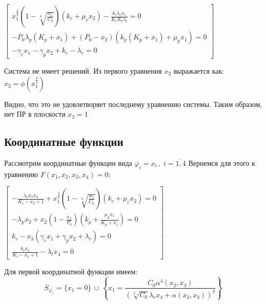 \documentclass[11pt]{article}
\begin{document}
    
    $\displaystyle \left[\begin{matrix}x_{1}^{\frac{3}{4}} \left(1 - \sqrt[4]{\frac{x_{1}}{C_{0}}}\right) \left(k_{c} + \mu_{c} x_{2}\right) - \frac{k_{t} \lambda_{c} x_{1}}{K_{c} K_{t} \lambda_{t}} = 0\\- P_{0} \lambda_{p} \left(K_{p} + x_{1}\right) + \left(P_{0} - x_{2}\right) \left(k_{p} \left(K_{p} + x_{1}\right) + \mu_{p} x_{1}\right) = 0\\- \gamma_{c} x_{1} - \gamma_{p} x_{2} + k_{r} - \lambda_{r} = 0\end{matrix}\right]$

    
    Система не имеет решений. Из первого уравнения $x_2$ выражается как:  $x_2 = \phi(x_1^{\frac{3}{4}})$

    
    Видно, что это не удовлетворяет последнему уравнению системы. Таким образом, нет ПР в плоскости $x_3 = 1$

    
    \hypertarget{ux43aux43eux43eux440ux434ux438ux43dux430ux442ux43dux44bux435-ux444ux443ux43dux43aux446ux438ux438}{%
\subsection{Координатные
функции}\label{ux43aux43eux43eux440ux434ux438ux43dux430ux442ux43dux44bux435-ux444ux443ux43dux43aux446ux438ux438}}

    Рассмотрим координатные функции вида
\(\varphi_i = x_i\,,\; i = \overline{1,4}\) Вернемся для этого к
уравнению \(F(x_1,x_2,x_3,x_4) = 0:\)

    $\displaystyle \left[\begin{matrix}- \frac{\lambda_{c} x_{1} x_{4}}{K_{c} - x_{3} + 1} + x_{1}^{\frac{3}{4}} \left(1 - \sqrt[4]{\frac{x_{1}}{C_{0}}}\right) \left(k_{c} + \mu_{c} x_{2}\right) = 0\\- \lambda_{p} x_{2} + x_{2} \left(1 - \frac{x_{2}}{P_{0}}\right) \left(k_{p} + \frac{\mu_{p} x_{1}}{K_{p} + x_{1}}\right) = 0\\k_{r} - x_{3} \left(\gamma_{c} x_{1} + \gamma_{p} x_{2} + \lambda_{r}\right) = 0\\\frac{k_{t} x_{3}}{K_{t} - x_{3} + 1} - \lambda_{t} x_{4} = 0\end{matrix}\right]$

    
    Для первой координатной функции имеем:
\[ S_{\varphi_1} = \{ x_1 = 0\}\, \cup \, 
\left\{ x_1 = 
\frac{C_{0} \alpha^{4}{\left(x_{2},x_{3} \right)}}{\left(\sqrt[4]{C_{0}} \lambda_{c} x_{4} + \alpha{\left(x_{2},x_{3} \right)}\right)^{4}}
\right\} \]
\end{document}
